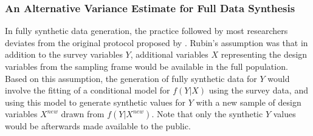 \subsubsection{An Alternative Variance Estimate for Full Data Synthesis}
\label{subsubsec:alt-var-est}
In fully synthetic data generation, the practice followed by most researchers deviates from the original protocol proposed by \citet{rubin1993discussion}. Rubin's assumption was that in addition to the survey variables $Y$, additional variables $X$ representing the design variables from the sampling frame would be available in the full population. Based on this assumption, the generation of fully synthetic data for $Y$ would involve the fitting of a conditional model for $f(Y | X)$ using the survey data, and using this model to generate synthetic values for $Y$ with a new sample of design variables $X^{new}$ drawn from $f(Y | X^{new})$. Note that only the synthetic $Y$ values would be afterwards made available to the public.

